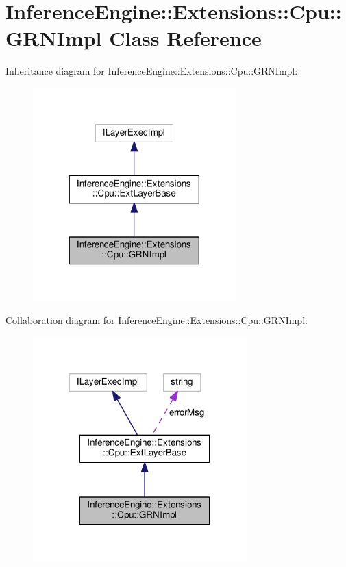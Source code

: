 \hypertarget{classInferenceEngine_1_1Extensions_1_1Cpu_1_1GRNImpl}{}\section{Inference\+Engine\+:\+:Extensions\+:\+:Cpu\+:\+:G\+R\+N\+Impl Class Reference}
\label{classInferenceEngine_1_1Extensions_1_1Cpu_1_1GRNImpl}


Inheritance diagram for Inference\+Engine\+:\+:Extensions\+:\+:Cpu\+:\+:G\+R\+N\+Impl\+:
\nopagebreak
\begin{figure}[H]
\begin{center}
\leavevmode
\includegraphics[width=222pt]{classInferenceEngine_1_1Extensions_1_1Cpu_1_1GRNImpl__inherit__graph}
\end{center}
\end{figure}


Collaboration diagram for Inference\+Engine\+:\+:Extensions\+:\+:Cpu\+:\+:G\+R\+N\+Impl\+:
\nopagebreak
\begin{figure}[H]
\begin{center}
\leavevmode
\includegraphics[width=234pt]{classInferenceEngine_1_1Extensions_1_1Cpu_1_1GRNImpl__coll__graph}
\end{center}
\end{figure}
